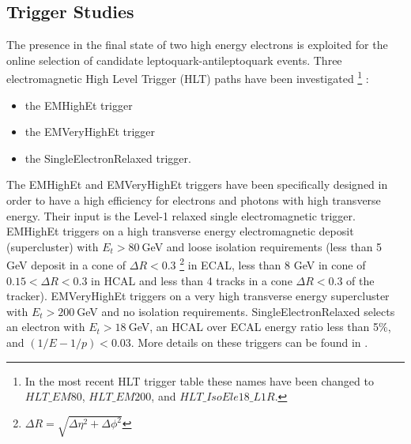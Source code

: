 \documentclass[colclass=cmspaper]{combine}
\begin{document}
\begin{linenumbers}

\section{Trigger Studies} \label{sec:trig}

The presence in the final state of two high energy electrons is exploited for the online selection 
of candidate leptoquark-antileptoquark events. 
Three electromagnetic High Level Trigger (HLT) paths have been investigated
 \footnote{In the most recent HLT trigger table these names have been changed to $HLT\_EM80$, $HLT\_EM200$, 
and $HLT\_IsoEle18\_L1R$.}
:
\begin{itemize}
\item the EMHighEt trigger 
\item the EMVeryHighEt  trigger
\item the SingleElectronRelaxed trigger.
\end{itemize}

The EMHighEt and EMVeryHighEt triggers have been specifically designed in order to have a high 
efficiency for electrons and photons with high transverse energy. 
Their input is the Level-1 relaxed single electromagnetic trigger.
EMHighEt triggers on a high transverse energy electromagnetic deposit (supercluster) with
$E_t>80~$GeV and loose isolation requirements (less than 5 GeV deposit in a 
cone of $\Delta R<0.3$ \footnote{$\Delta R=\sqrt{\Delta\eta^2 + \Delta\phi ^2}$} in ECAL, less than 
8 GeV in cone of $0.15<\Delta R<0.3$ in HCAL and less than 4 tracks in a cone $\Delta R<0.3$ of the tracker).
EMVeryHighEt triggers on a very high transverse energy supercluster with $E_t>200~$GeV and no isolation 
requirements. SingleElectronRelaxed selects an electron with $E_t>18~$GeV, an HCAL over ECAL energy ratio less than 5\%, 
and $(1/E-1/p)<0.03$. More details on these triggers can be found in \cite{HeepHlt}.


\end{linenumbers}
\end{document}
